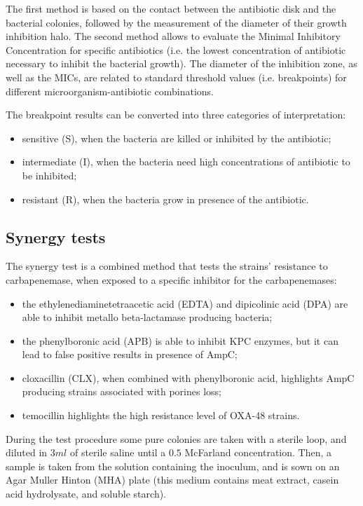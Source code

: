 \documentclass[11pt]{report}
\begin{document}
The first method is based on the contact between the antibiotic disk and the bacterial colonies, followed by the measurement of the diameter of their growth inhibition halo. 
The second method allows to evaluate the Minimal Inhibitory Concentration for specific antibiotics (i.e. the lowest concentration of antibiotic necessary to inhibit the bacterial growth).
The diameter of the inhibition zone, as well as the MICs, are related to standard threshold values (i.e. breakpoints) for different microorganism-antibiotic combinations.

The breakpoint results can be converted into three categories of interpretation:
\begin{itemize}
\item sensitive (S), when the bacteria are killed or inhibited by the antibiotic;
\item intermediate (I), when the bacteria need high concentrations of antibiotic to be inhibited;
\item resistant (R), when the bacteria grow in presence of the antibiotic.
\end{itemize}

\subsection{Synergy tests}
The synergy test is a combined method that tests the strains' resistance to carbapenemase, when exposed to a specific inhibitor for the carbapenemases:
\begin{itemize}
\item the ethylenediaminetetraacetic acid (EDTA) and dipicolinic acid (DPA) are able to inhibit metallo beta-lactamase producing bacteria;
\item the phenylboronic acid (APB) is able to inhibit KPC enzymes, but it can lead to false positive results in presence of AmpC;
\item cloxacillin (CLX), when combined with phenylboronic acid, highlights AmpC producing strains associated with porines loss;
\item temocillin highlights the high resistance level of OXA-48 strains.
\end{itemize}

During the test procedure some pure colonies are taken with a sterile loop, and diluted in $3ml$ of sterile saline until a $0.5$ McFarland concentration.
Then, a sample is taken from the solution containing the inoculum, and is sown on an Agar Muller Hinton (MHA) plate (this medium contains meat extract, casein acid hydrolysate, and soluble starch). 
\end{document}
